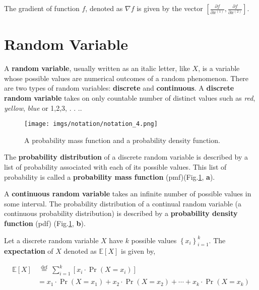 The gradient of function \(f\), denoted as \(\nabla f\) is given by the vector \(\left[\frac{\partial f}{\partial x^{(1)}}, \frac{\partial f}{\partial x^{(2)}}\right]\).

\section{Random Variable}

A \textbf{random variable}, usually written as an italic letter, like \(X\), is a variable whose possible values are numerical outcomes of a random phenomenon. There are two types of random variables: \textbf{discrete} and \textbf{continuous}. A \textbf{discrete random variable} takes on only countable number of distinct values such as \textit{red}, \textit{yellow}, \textit{blue} or 1,2,3, . . ..

\begin{figure}[H]
	\centering
	\texttt{[image: imgs/notation/notation\_4.png]}
	\caption{A probability mass function and a probability density function.}
	\label{fig:notation_4}
\end{figure}
The \textbf{probability distribution} of a discrete random variable is described by a list of probability associated with each of its possible values. This list of probability is called a \textbf{probability mass function} (pmf)(Fig.\ref{fig:notation_4}, \textbf{a}).

A \textbf{continuous random variable} takes an infinite number of possible values in some interval. The probability distribution of a continual random variable (a continuous probability distribution) is described by a \textbf{probability density function} (pdf) (Fig.\ref{fig:notation_4}, \textbf{b}).

Let a discrete random variable \(X\) have \(k\) possible values \(\left\{x_{i}\right\}_{i=1}^{k}\). The \textbf{expectation} of \(X\) denoted as \(\mathbb{E}[X]\) is given by,

\begin{equation}
	\begin{aligned}
		\mathbb{E}[X] & \stackrel{\text { def }}{=} \sum_{i=1}^{k}\left[x_{i} \cdot \operatorname{Pr}\left(X=x_{i}\right)\right] \\ & =x_{1} \cdot \operatorname{Pr}\left(X=x_{1}\right)+x_{2} \cdot \operatorname{Pr}\left(X=x_{2}\right)+\cdots+x_{k} \cdot \operatorname{Pr}\left(X=x_{k}\right)
	\end{aligned}
	\label{notation:1}
\end{equation}

